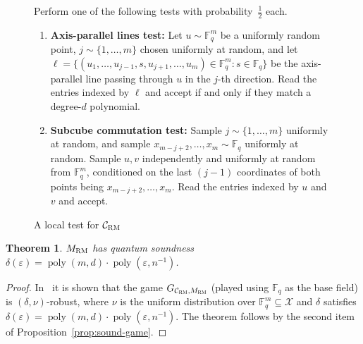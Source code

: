 \documentclass[11pt]{article}
\newtheorem{theorem}{Theorem}[section]
\theoremstyle{definition}
\newcommand{\code}{\mathcal{C}}
\newcommand{\F}{\ensuremath{\mathbb{F}}}
\newcommand{\mX}{\ensuremath{\mathcal{X}}}
\newcommand{\RM}{\ensuremath{\textsc{RM}}}
\DeclareMathOperator{\poly}{poly}
\newcommand{\eps}{\varepsilon}
\newenvironment{gamespec}{
  \begin{mdframed}[style=figstyle]}{
  \end{mdframed}}
\begin{document}
\begin{figure}[!htbp]
  \centering
  \begin{gamespec}
Perform one of the following tests with probability~$\tfrac{1}{2}$ each. 
\begin{enumerate}
	\item \textbf{Axis-parallel lines test:}
		Let $u \sim \F_q^m$ be a uniformly random point, $j\sim \{1,\ldots,m\}$ chosen uniformly at random,
		and let $\ell = \{ (u_1,\ldots,u_{j-1},s,u_{j+1},\ldots,u_m) \in \F_q^m : s \in \F_q \}$
		be the axis-parallel line passing through $u$ in the $j$-th direction. Read the entries indexed by $\ell$ and accept if and only if they match a degree-$d$ polynomial. 
	\item \textbf{Subcube commutation test:}
	Sample $j \sim \{1,\ldots,m\}$ uniformly at random, and sample $x_{m-j+2},\ldots,x_{m} \sim \F_q$ uniformly at random. Sample $u,v$ independently and uniformly at random from $\F_q^m$, conditioned on the last $(j-1)$ coordinates of both points being $x_{m-j+2},\ldots,x_m$. Read the entries indexed by $u$ and $v$ and accept. 	
    \end{enumerate}
  \end{gamespec}
  \caption{A local test for $\code_{\RM}$}
  \label{fig:RM-tester}
\end{figure}



\begin{theorem}\label{thm:mrm-sound}
$M_\RM$ has quantum soundness $\delta(\eps)=\poly(m,d)\cdot \poly(\eps,n^{-1})$.
\end{theorem}

\begin{proof}
In~\cite{ji2022quantum} it is shown that the game $G_{\code_\RM,M_\RM}$ (played using $\F_q$ as the base field) is $(\delta,\nu)$-robust, where $\nu$ is the uniform distribution over $\F_q^m \subseteq \mX$ and $\delta$ satisfies $\delta(\eps)=\poly(m,d)\cdot \poly(\eps,n^{-1})$. The theorem follows by the second item of Proposition~\ref{prop:sound-game}. 
\end{proof}
\end{document}
